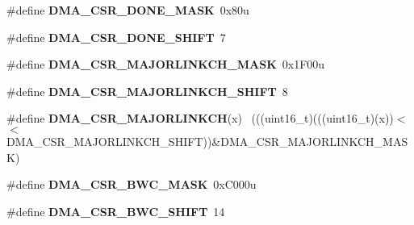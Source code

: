 \begin{DoxyCompactItemize}
\item 
\hypertarget{group___d_m_a___register___masks_ga63a7af3b93217908bd0f7e6aa569b0b5}{}\#define {\bfseries D\+M\+A\+\_\+\+C\+S\+R\+\_\+\+D\+O\+N\+E\+\_\+\+M\+A\+S\+K}~0x80u\label{group___d_m_a___register___masks_ga63a7af3b93217908bd0f7e6aa569b0b5}

\item 
\hypertarget{group___d_m_a___register___masks_gacb03d2516c82508167b19a28d81055a3}{}\#define {\bfseries D\+M\+A\+\_\+\+C\+S\+R\+\_\+\+D\+O\+N\+E\+\_\+\+S\+H\+I\+F\+T}~7\label{group___d_m_a___register___masks_gacb03d2516c82508167b19a28d81055a3}

\item 
\hypertarget{group___d_m_a___register___masks_ga46d684508f50948c307efc8c3411345f}{}\#define {\bfseries D\+M\+A\+\_\+\+C\+S\+R\+\_\+\+M\+A\+J\+O\+R\+L\+I\+N\+K\+C\+H\+\_\+\+M\+A\+S\+K}~0x1\+F00u\label{group___d_m_a___register___masks_ga46d684508f50948c307efc8c3411345f}

\item 
\hypertarget{group___d_m_a___register___masks_gab34f787f2b2a3a927614699cfe50051d}{}\#define {\bfseries D\+M\+A\+\_\+\+C\+S\+R\+\_\+\+M\+A\+J\+O\+R\+L\+I\+N\+K\+C\+H\+\_\+\+S\+H\+I\+F\+T}~8\label{group___d_m_a___register___masks_gab34f787f2b2a3a927614699cfe50051d}

\item 
\hypertarget{group___d_m_a___register___masks_ga10afd0fe3ccb8d3f0bab6bcebe4488bf}{}\#define {\bfseries D\+M\+A\+\_\+\+C\+S\+R\+\_\+\+M\+A\+J\+O\+R\+L\+I\+N\+K\+C\+H}(x)                                  ~(((uint16\+\_\+t)(((uint16\+\_\+t)(x))$<$$<$D\+M\+A\+\_\+\+C\+S\+R\+\_\+\+M\+A\+J\+O\+R\+L\+I\+N\+K\+C\+H\+\_\+\+S\+H\+I\+F\+T))\&D\+M\+A\+\_\+\+C\+S\+R\+\_\+\+M\+A\+J\+O\+R\+L\+I\+N\+K\+C\+H\+\_\+\+M\+A\+S\+K)\label{group___d_m_a___register___masks_ga10afd0fe3ccb8d3f0bab6bcebe4488bf}

\item 
\hypertarget{group___d_m_a___register___masks_ga1ff3a4e1294d6ea9b00b675241d79a60}{}\#define {\bfseries D\+M\+A\+\_\+\+C\+S\+R\+\_\+\+B\+W\+C\+\_\+\+M\+A\+S\+K}~0x\+C000u\label{group___d_m_a___register___masks_ga1ff3a4e1294d6ea9b00b675241d79a60}

\item 
\hypertarget{group___d_m_a___register___masks_gaf5c958b45ed9544b9877d50b330f2115}{}\#define {\bfseries D\+M\+A\+\_\+\+C\+S\+R\+\_\+\+B\+W\+C\+\_\+\+S\+H\+I\+F\+T}~14\label{group___d_m_a___register___masks_gaf5c958b45ed9544b9877d50b330f2115}


\end{DoxyCompactItemize}

